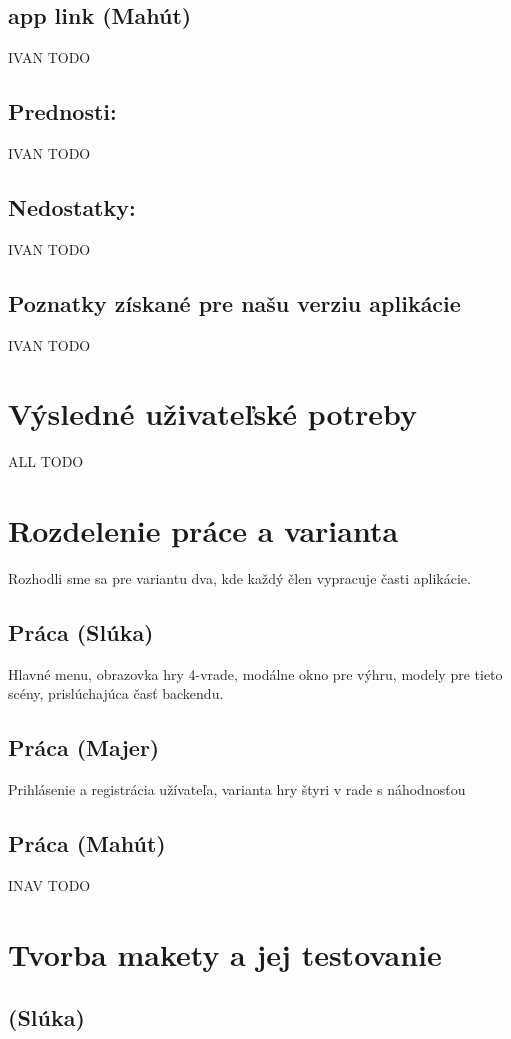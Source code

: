 \documentclass[a4paper, 11pt, onecolumn]{article}
\begin{document}
\subsection{app link (Mahút)}
IVAN TODO
\subsection*{Prednosti:}
IVAN TODO
\subsection*{Nedostatky:}
IVAN TODO
\subsection*{Poznatky získané pre našu verziu aplikácie}
IVAN TODO

\section{Výsledné uživateľské potreby}
ALL TODO

\section{Rozdelenie práce a varianta}

Rozhodli sme sa pre variantu dva, kde každý člen vypracuje časti aplikácie.
\subsection*{Práca (Slúka)}
Hlavné menu, obrazovka hry 4-vrade, modálne okno pre výhru, modely pre tieto scény, prislúchajúca časť backendu.\\
\subsection*{Práca (Majer)}
Prihlásenie a registrácia užívateľa, varianta hry štyri v rade s náhodnosťou
\subsection*{Práca (Mahút)}
INAV TODO

\section{Tvorba makety a jej testovanie}

\subsection{(Slúka)}
\end{document}
